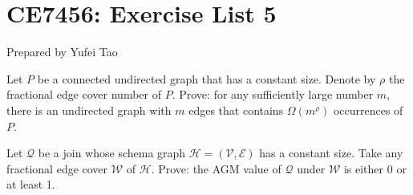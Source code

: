 


\usepackage{amsfonts, amsmath, amssymb, amsthm}
\usepackage{comment}
\usepackage{graphicx}
\usepackage{ifthen}
\usepackage{latexsym}
\usepackage[normalem]{ulem}



\def\agm{\mathit{AGM}}
\def\In{\text{IN}}
\def\out{\text{OUT}}
\def\E{\mathcal{E}}
\def\H{\mathcal{H}}
\def\Q{\mathcal{Q}}
\def\T{\mathcal{T}}
\def\V{\mathcal{V}}
\def\W{\mathscr{W}}


\def\vgap{\vspace{2mm}}



\section*{CE7456: Exercise List 5}
Prepared by Yufei Tao \\



 Let $P$ be a connected undirected graph that has a constant size. Denote by $\rho$ the fractional edge cover number of $P$. Prove: for any sufficiently large number $m$, there is an undirected graph with $m$ edges that contains $\Omega(m^\rho)$ occurrences of $P$.

 Let $\Q$ be a join whose schema graph $\H = (\V, \E)$ has a constant size. Take any fractional edge cover $\W$ of $\H$. Prove: the AGM value of $\Q$ under $\W$ is either 0 or at least 1.


